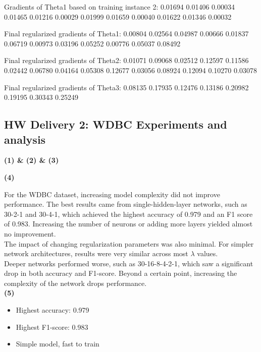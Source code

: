 \documentclass{article}
\begin{document}
Gradients of Theta1 based on training instance 2:
0.01694  0.01406  0.00034
0.01465  0.01216  0.00029
0.01999  0.01659  0.00040
0.01622  0.01346  0.00032

Final regularized gradients of Theta1:
0.00804  0.02564  0.04987
0.00666  0.01837  0.06719
0.00973  0.03196  0.05252
0.00776  0.05037  0.08492

Final regularized gradients of Theta2:
0.01071  0.09068  0.02512  0.12597  0.11586
0.02442  0.06780  0.04164  0.05308  0.12677
0.03056  0.08924  0.12094  0.10270  0.03078

Final regularized gradients of Theta3:
0.08135  0.17935  0.12476  0.13186
0.20982  0.19195  0.30343  0.25249

\newpage
\subsection*{HW Delivery 2: WDBC Experiments and analysis}

\noindent \textbf{(1) \& (2) \& (3)}

\begin{table}[htbp]
\centering
\caption{WDBC Result}
\end{table}

\noindent \textbf{(4)}

\noindent For the WDBC dataset, increasing model complexity did not improve performance. The best results came from single-hidden-layer networks, such as 30-2-1 and 30-4-1, which achieved the highest accuracy of 0.979 and an F1 score of 0.983. Increasing the number of neurons or adding more layers yielded almost no improvement.\\

\noindent The impact of changing regularization parameters was also minimal. For simpler network architectures, results were very similar across most $\lambda$ values.\\

\noindent Deeper networks performed worse, such as 30-16-8-4-2-1, which saw a significant drop in both accuracy and F1-score. Beyond a certain point, increasing the complexity of the network drops performance.\\

\noindent \textbf{(5)}

\noindent {}

\noindent {}
\begin{itemize}
    \item Highest accuracy: 0.979
    \item Highest F1-score: 0.983
    \item Simple model, fast to train
\end{itemize}
\end{document}
